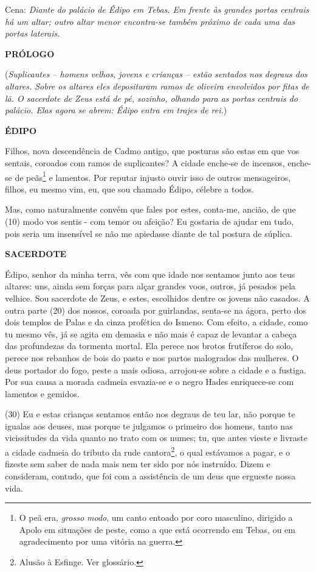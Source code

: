 Cena: \emph{Diante do palácio de Édipo em Tebas. Em frente às grandes
portas centrais há um altar; outro altar menor encontra-se também
próximo de cada uma das portas laterais. }

\textbf{PRÓLOGO}

(\emph{Suplicantes -- homens velhos, jovens e crianças -- estão sentados
nos degraus dos altares. Sobre os altares eles depositaram ramos de
oliveira envolvidos por fitas de lã. O sacerdote de Zeus está de pé,
sozinho, olhando para as portas centrais do palácio. Elas agora se
abrem: Édipo entra em trajes de rei.})

\textbf{ÉDIPO}

Filhos, nova descendência de Cadmo antigo, que posturas são estas em que
vos sentais, coroados com ramos de suplicantes? A cidade enche-se de
incensos, enche-se de peãs\footnote{O peã era, \emph{grosso modo}, um
  canto entoado por coro masculino, dirigido a Apolo em situações de
  peste, como a que está ocorrendo em Tebas, ou em agradecimento por uma
  vitória na guerra.} e lamentos. Por reputar injusto ouvir isso de
outros mensageiros, filhos, eu mesmo vim, eu, que sou chamado Édipo,
célebre a todos.

Mas, como naturalmente convém que fales por estes, conta-me, ancião, de
que (10) modo vos sentis - com temor ou afeição? Eu gostaria de ajudar
em tudo, pois seria um insensível se não me apiedasse diante de tal
postura de súplica.

\textbf{SACERDOTE}

Édipo, senhor da minha terra, vês com que idade nos sentamos junto aos
teus altares: uns, ainda sem forças para alçar grandes voos, outros, já
pesados pela velhice. Sou sacerdote de Zeus, e estes, escolhidos dentre
os jovens não casados. A outra parte (20) dos nossos, coroada por
guirlandas, senta-se na ágora, perto dos dois templos de Palas e da
cinza profética do Ismeno. Com efeito, a cidade, como tu mesmo vês, já
se agita em demasia e não mais é capaz de levantar a cabeça das
profundezas da tormenta mortal. Ela perece nos brotos frutíferos do
solo, perece nos rebanhos de bois do pasto e nos partos malogrados das
mulheres. O deus portador do fogo, peste a mais odiosa, arrojou-se sobre
a cidade e a fustiga. Por sua causa a morada cadmeia esvazia-se e o
negro Hades enriquece-se com lamentos e gemidos.

(30) Eu e estas crianças sentamos então nos degraus de teu lar, não
porque te igualas aos deuses, mas porque te julgamos o primeiro dos
homens, tanto nas vicissitudes da vida quanto no trato com os numes; tu,
que antes vieste e livraste a cidade cadmeia do tributo da rude
cantora\footnote{Alusão à Esfinge. Ver glossário.}, o qual estávamos a
pagar, e o fizeste sem saber de nada mais nem ter sido por nós
instruído. Dizem e consideram, contudo, que foi com a assistência de um
deus que ergueste nossa vida.

